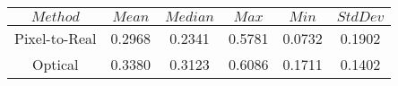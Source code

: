 \begin{table}[h]
\centering
\begin{tabular}{|c|c|c|c|c|c|}
\hline
$Method$ & $Mean$ & $Median$ & $Max$ & $Min$ & $StdDev$ \\
\hline
Pixel-to-Real & 0.2968 & 0.2341 & 0.5781 & 0.0732 & 0.1902 \\
\hline
Optical & 0.3380 & 0.3123 & 0.6086 & 0.1711 & 0.1402 \\
\hline
\end{tabular}
\end{table}
